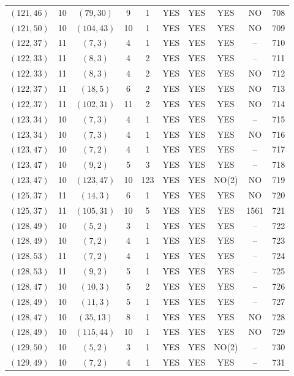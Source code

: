\begin{longtable}{|c|c|c|c|c|c|c|c|c|c|}
$(121, 46)$ & 10 & $(79, 30)$ & 9 & 1 & YES & YES & YES & NO & 708\\
$(121, 50)$ & 10 & $(104, 43)$ & 10 & 1 & YES & YES & YES & NO & 709\\
$(122, 37)$ & 11 & $(7, 3)$ & 4 & 1 & YES & YES & YES & -- & 710\\
$(122, 33)$ & 11 & $(8, 3)$ & 4 & 2 & YES & YES & YES & -- & 711\\
$(122, 33)$ & 11 & $(8, 3)$ & 4 & 2 & YES & YES & YES & NO & 712\\
$(122, 37)$ & 11 & $(18, 5)$ & 6 & 2 & YES & YES & YES & NO & 713\\
$(122, 37)$ & 11 & $(102, 31)$ & 11 & 2 & YES & YES & YES & NO & 714\\
$(123, 34)$ & 10 & $(7, 3)$ & 4 & 1 & YES & YES & YES & -- & 715\\
$(123, 34)$ & 10 & $(7, 3)$ & 4 & 1 & YES & YES & YES & NO & 716\\
$(123, 47)$ & 10 & $(7, 2)$ & 4 & 1 & YES & YES & YES & -- & 717\\
$(123, 47)$ & 10 & $(9, 2)$ & 5 & 3 & YES & YES & YES & -- & 718\\
$(123, 47)$ & 10 & $(123, 47)$ & 10 & 123 & YES & YES & NO(2) & NO & 719\\
$(125, 37)$ & 11 & $(14, 3)$ & 6 & 1 & YES & YES & YES & NO & 720\\
$(125, 37)$ & 11 & $(105, 31)$ & 10 & 5 & YES & YES & YES & 1561 & 721\\
$(128, 49)$ & 10 & $(5, 2)$ & 3 & 1 & YES & YES & YES & -- & 722\\
$(128, 49)$ & 10 & $(7, 2)$ & 4 & 1 & YES & YES & YES & -- & 723\\
$(128, 53)$ & 11 & $(7, 2)$ & 4 & 1 & YES & YES & YES & -- & 724\\
$(128, 53)$ & 11 & $(9, 2)$ & 5 & 1 & YES & YES & YES & -- & 725\\
$(128, 47)$ & 10 & $(10, 3)$ & 5 & 2 & YES & YES & YES & -- & 726\\
$(128, 49)$ & 10 & $(11, 3)$ & 5 & 1 & YES & YES & YES & -- & 727\\
$(128, 47)$ & 10 & $(35, 13)$ & 8 & 1 & YES & YES & YES & NO & 728\\
$(128, 49)$ & 10 & $(115, 44)$ & 10 & 1 & YES & YES & YES & NO & 729\\
$(129, 50)$ & 10 & $(5, 2)$ & 3 & 1 & YES & YES & NO(2) & -- & 730\\
$(129, 49)$ & 10 & $(7, 2)$ & 4 & 1 & YES & YES & YES & -- & 731\\

\end{longtable}
